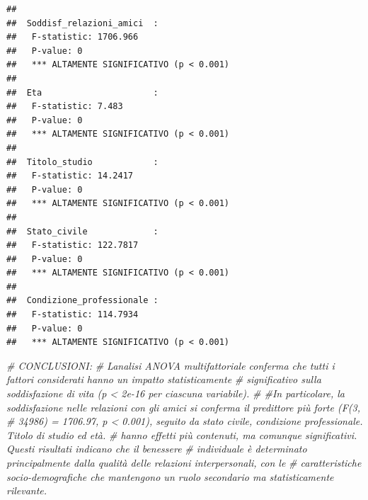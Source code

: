 \documentclass[
]{article}
\newenvironment{Shaded}{\begin{snugshade}}{\end{snugshade}}
\newcommand{\CommentTok}[1]{\textcolor[rgb]{0.56,0.35,0.01}{\textit{#1}}}
\begin{document}
\begin{verbatim}
## 
##  Soddisf_relazioni_amici  :
##   F-statistic: 1706.966 
##   P-value: 0 
##   *** ALTAMENTE SIGNIFICATIVO (p < 0.001)
## 
##  Eta                      :
##   F-statistic: 7.483 
##   P-value: 0 
##   *** ALTAMENTE SIGNIFICATIVO (p < 0.001)
## 
##  Titolo_studio            :
##   F-statistic: 14.2417 
##   P-value: 0 
##   *** ALTAMENTE SIGNIFICATIVO (p < 0.001)
## 
##  Stato_civile             :
##   F-statistic: 122.7817 
##   P-value: 0 
##   *** ALTAMENTE SIGNIFICATIVO (p < 0.001)
## 
##  Condizione_professionale :
##   F-statistic: 114.7934 
##   P-value: 0 
##   *** ALTAMENTE SIGNIFICATIVO (p < 0.001)
\end{verbatim}

\begin{Shaded}
\begin{Highlighting}[]
\CommentTok{\# CONCLUSIONI:}
\CommentTok{\# L\textquotesingle{}analisi ANOVA multifattoriale conferma che tutti i fattori considerati hanno un impatto statisticamente }
\CommentTok{\# significativo sulla soddisfazione di vita (p \textless{} 2e{-}16 per ciascuna variabile). }
\CommentTok{\# \#In particolare, la soddisfazione nelle relazioni con gli amici si conferma il predittore più forte (F(3,}
\CommentTok{\# 34986) = 1706.97, p \textless{} 0.001), seguito da stato civile, condizione professionale. Titolo di studio ed età.}
\CommentTok{\# hanno effetti più contenuti, ma comunque significativi. Questi risultati indicano che il benessere}
\CommentTok{\# individuale è determinato principalmente dalla qualità delle relazioni interpersonali, con le   }
\CommentTok{\# caratteristiche socio{-}demografiche che mantengono un ruolo secondario ma statisticamente rilevante. }
\end{Highlighting}
\end{Shaded}
\end{document}
